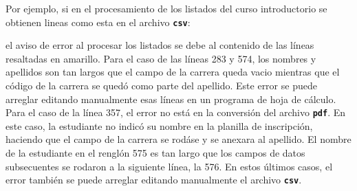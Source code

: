 \documentclass[letterpaper,12pt]{book}
\newcommand{\fileformat}[1]{\textbf{\texttt{#1}}}
\begin{document}
Por ejemplo, si en el procesamiento de los listados del curso introductorio se obtienen lineas como esta en el archivo \fileformat{csv}:

\begingroup
	\ttfamily 
	\noindent{}
\endgroup

\noindent{}el aviso de error al procesar los listados se debe al contenido de las líneas resaltadas en amarillo. Para el caso de las líneas 283 y 574, los nombres y apellidos son tan largos que el campo de la carrera queda vacio mientras que el código de la carrera se quedó como parte del apellido. Este error se puede arreglar editando manualmente esas líneas en un programa de hoja de cálculo.  Para el caso de la línea 357, el error no está en la conversión del archivo \fileformat{pdf}. En este caso, la estudiante no indicó su nombre en la planilla de inscripción, haciendo que el campo de la carrera se rodáse y se anexara al apellido. El nombre de la estudiante en el renglón 575 es tan largo que los campos de datos subsecuentes se rodaron a la siguiente línea, la 576. En estos últimos casos, el error también se puede arreglar editando manualmente el archivo \fileformat{csv}.
\end{document}
